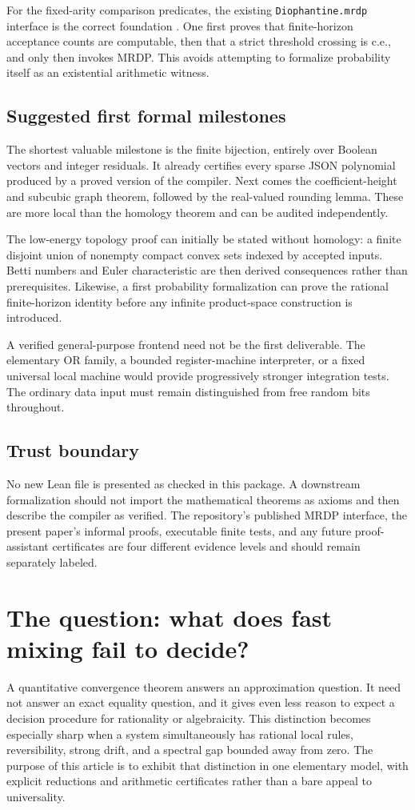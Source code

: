 \documentclass[11pt,letterpaper]{article}
\numberwithin{equation}{section}
\theoremstyle{definition}
\theoremstyle{remark}
\newcommand{\srcmark}[1]{\par\noindent{\small\itshape [source~#1]}\par}
\begin{document}
For the fixed-arity comparison predicates, the existing
\texttt{Diophantine.mrdp} interface is the correct foundation
\cite{b62s13-repoMRDP}. One first proves that finite-horizon acceptance counts are
computable, then that a strict threshold crossing is c.e., and only then
invokes MRDP. This avoids attempting to formalize probability itself as
an existential arithmetic witness.

\subsection{Suggested first formal milestones}
The shortest valuable milestone is the finite bijection, entirely over
Boolean vectors and integer residuals. It already certifies every sparse
JSON polynomial produced by a proved version of the compiler. Next comes
the coefficient-height and subcubic graph theorem, followed by the
real-valued rounding lemma. These are more local than the homology theorem
and can be audited independently.

The low-energy topology proof can initially be stated without homology:
a finite disjoint union of nonempty compact convex sets indexed by
accepted inputs. Betti numbers and Euler characteristic are then derived
consequences rather than prerequisites. Likewise, a first probability
formalization can prove the rational finite-horizon identity before any
infinite product-space construction is introduced.

A verified general-purpose frontend need not be the first deliverable.
The elementary OR family, a bounded register-machine interpreter, or a
fixed universal local machine would provide progressively stronger
integration tests. The ordinary data input must remain distinguished
from free random bits throughout.

\subsection{Trust boundary}
No new Lean file is presented as checked in this package. A downstream
formalization should not import the mathematical theorems as axioms and
then describe the compiler as verified. The repository's published MRDP
interface, the present paper's informal proofs, executable finite tests,
and any future proof-assistant certificates are four different evidence
levels and should remain separately labeled.

\section{The question: what does fast mixing fail to decide?}
\label{pqc:rv:sec:intro}
\srcmark{17}
A quantitative convergence theorem answers an approximation question.
It need not answer an exact equality question, and it gives even less
reason to expect a decision procedure for rationality or algebraicity.
This distinction becomes especially sharp when a system simultaneously
has rational local rules, reversibility, strong drift, and a spectral gap
bounded away from zero. The purpose of this article is to exhibit that
distinction in one elementary model, with explicit reductions and
arithmetic certificates rather than a bare appeal to universality.
\end{document}
